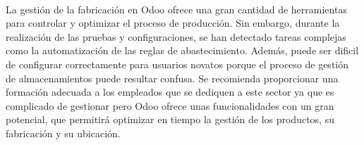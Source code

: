 \paragraph{}
La gestión de la fabricación en Odoo ofrece una gran cantidad de herramientas para controlar y optimizar el proceso de producción. Sin embargo, durante la realización de las pruebas y configuraciones, se han detectado tareas complejas como la automatización de las reglas de abastecimiento. Además, puede ser dificil de configurar correctamente para usuarios novatos porque el proceso de gestión de almacenamientos puede resultar confusa. Se recomienda proporcionar una formación adecuada a los empleados que se dediquen a este sector ya que es complicado de gestionar pero Odoo ofrece unas funcionalidades con un gran potencial, que permitirá optimizar en tiempo la gestión de los productos, su fabricación y su ubicación.